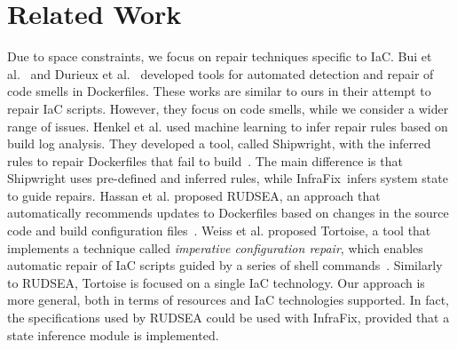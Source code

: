 \documentclass[sigconf,nonacm]{acmart}
\def\name{{\sc InfraFix}}
\begin{document}
\section{Related Work}


Due to space constraints, we focus on repair techniques specific to IaC.
Bui et al.~\cite{bui2023dockercleaner} and Durieux et al.~\cite{durieux2023parfum} developed tools for automated detection and repair of code smells in Dockerfiles. %
These works are similar to ours in their attempt to repair IaC scripts. 
However, they focus on code smells, while we consider a wider range of issues.
Henkel et al. used machine learning to infer repair rules based on build log analysis. They developed a tool, called Shipwright, with the inferred rules to repair Dockerfiles that fail to build~\cite{henkel2021shipwright}. %
The main difference is that Shipwright uses pre-defined and inferred rules, while \name\ infers system state to guide repairs.
Hassan et al. proposed RUDSEA, an approach that automatically recommends updates to Dockerfiles based on changes in the source code and build configuration files~\cite{hassan2018rudsea}. Weiss et al. proposed Tortoise, a tool that implements a technique called \emph{imperative configuration repair}, which enables automatic repair of IaC scripts guided by a series of shell commands~\cite{weiss2017tortoise}.
Similarly to RUDSEA, Tortoise is focused on a single IaC technology. Our approach is more general, both in terms of resources and IaC technologies supported. 
In fact, the specifications used by RUDSEA
could be used with 
\name,
provided that a state inference module is implemented.
\end{document}
